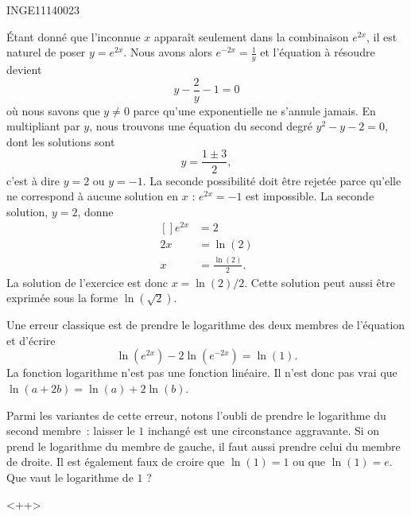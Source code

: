 

\begin{corrige}{INGE11140023}

	Étant donné que l'inconnue $x$ apparaît seulement dans la combinaison $e^{2x}$, il est naturel de poser $y= e^{2x}$. Nous avons alors $ e^{-2x}=\frac{1}{ y }$ et l'équation à résoudre devient
	\begin{equation}
		y-\frac{ 2 }{ y }-1=0
	\end{equation}
	où nous savons que $y\neq 0$ parce qu'une exponentielle ne s'annule jamais. En multipliant par $y$, nous trouvons une équation du second degré $y^2-y-2=0$, dont les solutions sont
	\begin{equation}
		y=\frac{ 1\pm 3 }{2},
	\end{equation}
	c'est à dire $y=2$ ou $y=-1$. La seconde possibilité doit être rejetée parce qu'elle ne correspond à aucune solution en $x$ : $ e^{2x}=-1$ est impossible. La seconde solution, $y=2$, donne
	\begin{equation}
		\begin{aligned}[]
			e^{2x}&=2\\
			2x&=\ln(2)\\
			x&=\frac{ \ln(2) }{ 2 }.
		\end{aligned}
	\end{equation}
	La solution de l'exercice est donc $x=\ln(2)/2$. Cette solution peut aussi être exprimée sous la forme $\ln(\sqrt{2})$.

	\begin{remark}
		Une erreur classique est de prendre le logarithme des deux membres de l'équation et d'écrire
		\begin{equation}
			\ln( e^{2x})-2\ln( e^{-2x})=\ln(1).
		\end{equation}
		La fonction logarithme n'est pas une fonction linéaire. Il n'est donc pas vrai que $\ln(a+2b)=\ln(a)+2\ln(b)$.

		Parmi les variantes de cette erreur, notons l'oubli de prendre le logarithme du second membre~: laisser le $1$ inchangé est une circonstance aggravante. Si on prend le logarithme du membre de gauche, il faut aussi prendre celui du membre de droite. Il est également faux de croire que $\ln(1)=1$ ou que $\ln(1)=e$. Que vaut le logarithme de $1$ ?
	\end{remark}
	<++>

\end{corrige}
